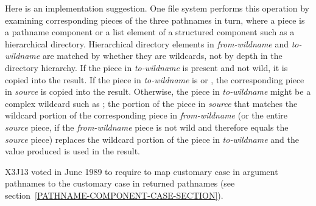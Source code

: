 \begin{newer}
\begin{defun}[Function]
    Here is an implementation suggestion.   One file system performs this operation by
    examining corresponding pieces of the three pathnames in turn, where a piece is a
    pathname component or a list element of a structured component such as
    a hierarchical directory.  Hierarchical directory elements in
    {\it from-wildname} and {\it to-wildname} are matched by whether they are
    wildcards, not by depth in the directory hierarchy.  If the piece in
    {\it to-wildname} is present and not wild, it is copied into the result.
    If the piece in {\it to-wildname} is  or , the corresponding
    piece in {\it source} is
    copied into the result.  Otherwise, the piece in {\it to-wildname} might be
    a complex wildcard such as ; the portion of the piece in {\it source}
    that matches the
    wildcard portion of the corresponding piece in {\it from-wildname} (or the entire
    {\it source} piece, if the {\it from-wildname} piece is not wild and therefore
    equals the {\it source} piece) replaces the wildcard
    portion of the piece in {\it to-wildname} and the value produced is used in
    the result.

X3J13 voted in June 1989  to
require  to map customary case in argument
pathnames to the customary case in returned pathnames
(see section~\ref{PATHNAME-COMPONENT-CASE-SECTION}).


\end{defun}
\end{newer}
